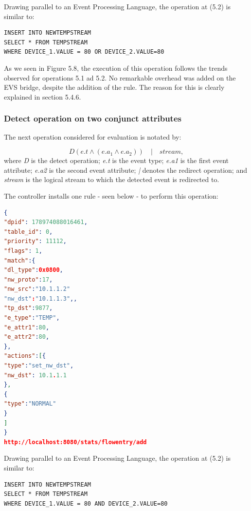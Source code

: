 Drawing parallel to an Event Processing Language, the operation at (5.2) is similar to:

\begin{verbatim}
INSERT INTO NEWTEMPSTREAM
SELECT * FROM TEMPSTREAM
WHERE DEVICE_1.VALUE = 80 OR DEVICE_2.VALUE=80
\end{verbatim}

As we seen in Figure 5.8, the execution of this operation follows the trends observed for operations 5.1 ad 5.2. No remarkable overhead was added on the EVS bridge, despite the addition of the rule. The reason for this is clearly explained in section 5.4.6.


\subsubsection{Detect operation on two conjunct attributes}
The next operation considered for evaluation is notated by:

\begin{equation}D(e.t  \wedge (e.a_1 \wedge e.a_2)) \quad | \quad stream, \end{equation}
where \textit{D} is the detect operation; \newline
\textit{e.t} is the event type; \newline
\textit{e.a1} is the first event attribute; \newline
\textit{e.a2} is the second event attribute;
\textit{|} denotes the redirect operation; \newline
and \textit{stream} is the logical stream to which the detected event is redirected to. \newline \newline

The controller installs one rule - seen below - to perform this operation:
\begin{lstlisting}[language=json,firstnumber=1]
{
"dpid": 178974088016461,
"table_id": 0,
"priority": 11112,
"flags": 1,
"match":{
"dl_type":0x0800,
"nw_proto":17,
"nw_src":"10.1.1.2"
"nw_dst":"10.1.1.3",,
"tp_dst":9877,
"e_type":"TEMP",
"e_attr1":80,
"e_attr2":80,
},
"actions":[{
"type":"set_nw_dst",
"nw_dst": 10.1.1.1
},
{
"type":"NORMAL"
}
]
}
http://localhost:8080/stats/flowentry/add \end{lstlisting}

Drawing parallel to an Event Processing Language, the operation at (5.2) is similar to:

\begin{verbatim}
INSERT INTO NEWTEMPSTREAM
SELECT * FROM TEMPSTREAM
WHERE DEVICE_1.VALUE = 80 AND DEVICE_2.VALUE=80
\end{verbatim}

